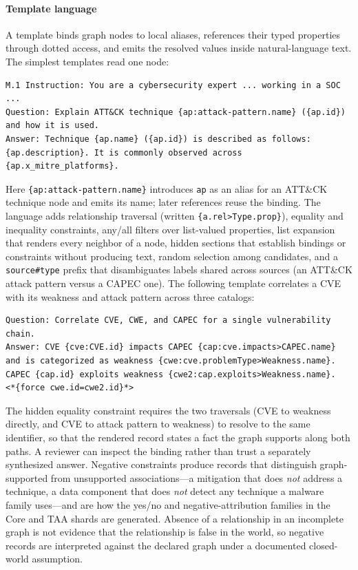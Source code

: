 \documentclass[a4paper,fleqn]{cas-dc}
\begin{document}
\paragraph{Template language}
A template binds graph nodes to local aliases, references their typed properties through dotted access, and emits the resolved values inside natural-language text. The simplest templates read one node:
\begin{lstlisting}
M.1 Instruction: You are a cybersecurity expert ... working in a SOC ...
Question: Explain ATT&CK technique {ap:attack-pattern.name} ({ap.id}) and how it is used.
Answer: Technique {ap.name} ({ap.id}) is described as follows: {ap.description}. It is commonly observed across {ap.x_mitre_platforms}.
\end{lstlisting}
Here \texttt{\{ap:attack-pattern.name\}} introduces \texttt{ap} as an alias for an ATT\&CK technique node and emits its name; later references reuse the binding. The language adds relationship traversal (written \texttt{\{a.rel>Type.prop\}}), equality and inequality constraints, any/all filters over list-valued properties, list expansion that renders every neighbor of a node, hidden sections that establish bindings or constraints without producing text, random selection among candidates, and a \texttt{source\#type} prefix that disambiguates labels shared across sources (an ATT\&CK attack pattern versus a CAPEC one). The following template correlates a CVE with its weakness and attack pattern across three catalogs:
\begin{lstlisting}
Question: Correlate CVE, CWE, and CAPEC for a single vulnerability chain.
Answer: CVE {cve:CVE.id} impacts CAPEC {cap:cve.impacts>CAPEC.name}
and is categorized as weakness {cwe:cve.problemType>Weakness.name}.
CAPEC {cap.id} exploits weakness {cwe2:cap.exploits>Weakness.name}.
<*{force cwe.id=cwe2.id}*>
\end{lstlisting}
The hidden equality constraint requires the two traversals (CVE to weakness directly, and CVE to attack pattern to weakness) to resolve to the same identifier, so that the rendered record states a fact the graph supports along both paths. A reviewer can inspect the binding rather than trust a separately synthesized answer. Negative constraints produce records that distinguish graph-supported from unsupported associations---a mitigation that does \emph{not} address a technique, a data component that does \emph{not} detect any technique a malware family uses---and are how the yes/no and negative-attribution families in the Core and TAA shards are generated. Absence of a relationship in an incomplete graph is not evidence that the relationship is false in the world, so negative records are interpreted against the declared graph under a documented closed-world assumption.
\end{document}
